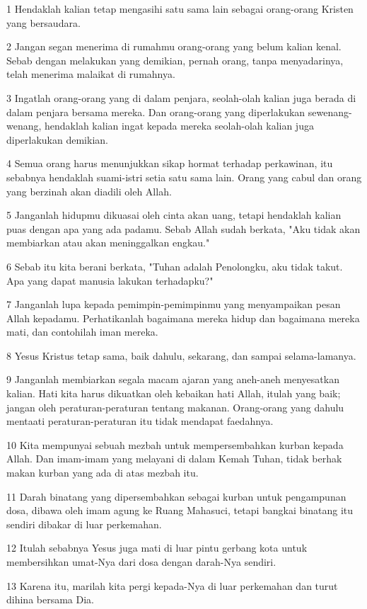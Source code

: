 \par 1 Hendaklah kalian tetap mengasihi satu sama lain sebagai orang-orang Kristen yang bersaudara.
\par 2 Jangan segan menerima di rumahmu orang-orang yang belum kalian kenal. Sebab dengan melakukan yang demikian, pernah orang, tanpa menyadarinya, telah menerima malaikat di rumahnya.
\par 3 Ingatlah orang-orang yang di dalam penjara, seolah-olah kalian juga berada di dalam penjara bersama mereka. Dan orang-orang yang diperlakukan sewenang-wenang, hendaklah kalian ingat kepada mereka seolah-olah kalian juga diperlakukan demikian.
\par 4 Semua orang harus menunjukkan sikap hormat terhadap perkawinan, itu sebabnya hendaklah suami-istri setia satu sama lain. Orang yang cabul dan orang yang berzinah akan diadili oleh Allah.
\par 5 Janganlah hidupmu dikuasai oleh cinta akan uang, tetapi hendaklah kalian puas dengan apa yang ada padamu. Sebab Allah sudah berkata, "Aku tidak akan membiarkan atau akan meninggalkan engkau."
\par 6 Sebab itu kita berani berkata, "Tuhan adalah Penolongku, aku tidak takut. Apa yang dapat manusia lakukan terhadapku?"
\par 7 Janganlah lupa kepada pemimpin-pemimpinmu yang menyampaikan pesan Allah kepadamu. Perhatikanlah bagaimana mereka hidup dan bagaimana mereka mati, dan contohilah iman mereka.
\par 8 Yesus Kristus tetap sama, baik dahulu, sekarang, dan sampai selama-lamanya.
\par 9 Janganlah membiarkan segala macam ajaran yang aneh-aneh menyesatkan kalian. Hati kita harus dikuatkan oleh kebaikan hati Allah, itulah yang baik; jangan oleh peraturan-peraturan tentang makanan. Orang-orang yang dahulu mentaati peraturan-peraturan itu tidak mendapat faedahnya.
\par 10 Kita mempunyai sebuah mezbah untuk mempersembahkan kurban kepada Allah. Dan imam-imam yang melayani di dalam Kemah Tuhan, tidak berhak makan kurban yang ada di atas mezbah itu.
\par 11 Darah binatang yang dipersembahkan sebagai kurban untuk pengampunan dosa, dibawa oleh imam agung ke Ruang Mahasuci, tetapi bangkai binatang itu sendiri dibakar di luar perkemahan.
\par 12 Itulah sebabnya Yesus juga mati di luar pintu gerbang kota untuk membersihkan umat-Nya dari dosa dengan darah-Nya sendiri.
\par 13 Karena itu, marilah kita pergi kepada-Nya di luar perkemahan dan turut dihina bersama Dia.
